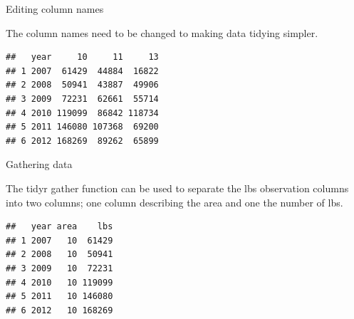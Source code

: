 \documentclass[ignorenonframetext,]{beamer}
\newenvironment{Shaded}{\begin{snugshade}}{\end{snugshade}}
\newcommand{\KeywordTok}[1]{\textcolor[rgb]{0.13,0.29,0.53}{\textbf{#1}}}
\newcommand{\DataTypeTok}[1]{\textcolor[rgb]{0.13,0.29,0.53}{#1}}
\newcommand{\DecValTok}[1]{\textcolor[rgb]{0.00,0.00,0.81}{#1}}
\newcommand{\StringTok}[1]{\textcolor[rgb]{0.31,0.60,0.02}{#1}}
\newcommand{\OperatorTok}[1]{\textcolor[rgb]{0.81,0.36,0.00}{\textbf{#1}}}
\newcommand{\NormalTok}[1]{#1}
\begin{document}
\begin{frame}[fragile]{Editing column names}

The column names need to be changed to making data tidying simpler.

\begin{Shaded}
\end{Shaded}

\begin{verbatim}
##   year     10     11     13
## 1 2007  61429  44884  16822
## 2 2008  50941  43887  49906
## 3 2009  72231  62661  55714
## 4 2010 119099  86842 118734
## 5 2011 146080 107368  69200
## 6 2012 168269  89262  65899
\end{verbatim}

\end{frame}

\begin{frame}[fragile]{Gathering data}

The tidyr gather function can be used to separate the lbs observation
columns into two columns; one column describing the area and one the
number of lbs.

\begin{Shaded}
\end{Shaded}

\begin{verbatim}
##   year area    lbs
## 1 2007   10  61429
## 2 2008   10  50941
## 3 2009   10  72231
## 4 2010   10 119099
## 5 2011   10 146080
## 6 2012   10 168269
\end{verbatim}

\end{frame}
\end{document}
